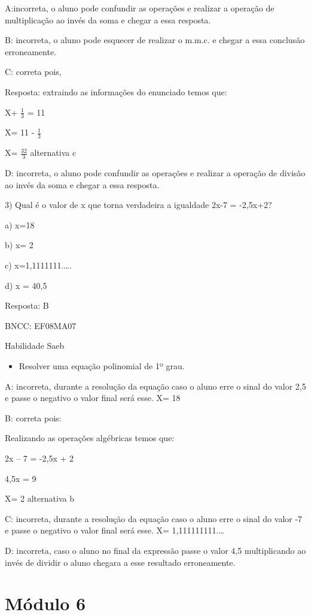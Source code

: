 A:incorreta, o aluno pode confundir as operações e realizar a operação
de multiplicação ao invés da soma e chegar a essa resposta.

B: incorreta, o aluno pode esquecer de realizar o m.m.c. e chegar a essa
conclusão erroneamente.

C: correta pois,

Resposta: extraindo as informações do enunciado temos que:

X+ \(\frac{1}{3}\) = 11

X= 11 - \(\frac{1}{3}\)

X= \(\frac{32}{3}\) alternativa c

D: incorreta, o aluno pode confundir as operações e realizar a operação
de divisão ao invés da soma e chegar a essa resposta.

3) Qual é o valor de x que torna verdadeira a igualdade 2x-7 = -2,5x+2?

a) x=18

b) x= 2

c) x=1,1111111.\ldots.

d) x = 40,5

Resposta: B

BNCC: EF08MA07

Habilidade Saeb

\begin{itemize}
\tightlist
\item
  Resolver uma equação polinomial de 1º grau.
\end{itemize}

A: incorreta, durante a resolução da equação caso o aluno erre o sinal
do valor 2,5 e passe o negativo o valor final será esse. X= 18

B: correta pois:

Realizando as operações algébricas temos que:

2x -- 7 = -2,5x + 2

4,5x = 9

X= 2 alternativa b

C: incorreta, durante a resolução da equação caso o aluno erre o sinal
do valor -7 e passe o negativo o valor final será esse. X=
1,111111111.\ldots{}

D: incorreta, caso o aluno no final da expressão passe o valor 4,5
multiplicando ao invés de dividir o aluno chegara a esse resultado
erroneamente.

\hypertarget{muxf3dulo-6}{%
\section{Módulo 6}\label{muxf3dulo-6}}


